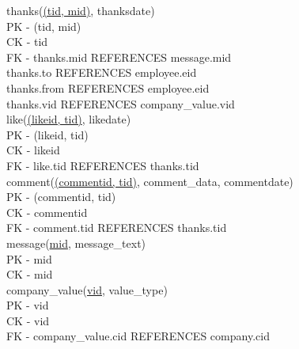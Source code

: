\documentclass[11pt]{report}
\begin{document}
thanks(\underline{(tid, mid)}, thanksdate) \\
PK - (tid, mid) \\
CK - tid \\
FK - thanks.mid REFERENCES message.mid \\
     thanks.to REFERENCES employee.eid \\
     thanks.from REFERENCES employee.eid \\
     thanks.vid REFERENCES company\_value.vid \\

like(\underline{(likeid, tid)}, likedate) \\
PK - (likeid, tid) \\
CK - likeid \\
FK - like.tid REFERENCES thanks.tid \\

comment(\underline{(commentid, tid)}, comment\_data, commentdate) \\
PK - (commentid, tid) \\
CK - commentid \\
FK - comment.tid REFERENCES thanks.tid \\

message(\underline{mid}, message\_text) \\
PK - mid \\
CK - mid \\

company\_value(\underline{vid}, value\_type) \\
PK - vid \\
CK - vid \\
FK - company\_value.cid REFERENCES company.cid
\clearpage
\end{document}
